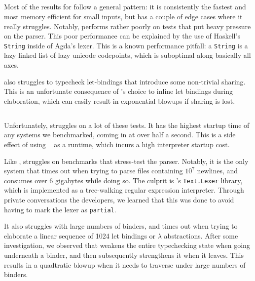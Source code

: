 \documentclass[a4paper,UKenglish,cleveref, autoref, thm-restate,anonymous]{lipics-v2021}
\begin{document}
\subsection{\agda}

Most of the results for \agda follow a general pattern: it is consistently the
fastest and most memory efficient for small inputs, but has a couple of edge
cases where it really struggles. Notably, \agda performs rather poorly on tests
that put heavy pressure on the parser. This poor performance can be explained
by the use of Haskell's \lstinline|String| inside of Agda's lexer. This is a
known performance pitfall: a \lstinline|String| is a lazy linked list of lazy
unicode codepoints, which is suboptimal along basically all axes.

\agda also struggles to typecheck let-bindings that introduce some non-trivial
sharing. This is an unfortunate consequence of \agda's choice to inline let
bindings during elaboration, which can easily result in exponential blowups
if sharing is lost.

\subsection{\idris}

Unfortunately, \idris struggles on a lot of these tests. It has the highest startup time
of any systems we benchmarked, coming in at over half a second. This is a side effect of using
\chez~\cite{Dybvig:2006} as a runtime, which incurs a high interpreter startup cost.

Like \agda, \idris struggles on benchmarks that stress-test the parser. Notably, it
is the only system that times out when trying to parse files containing \(10^{7}\) newlines,
and consumes over 6 gigabytes while doing so. The culprit is \idris's \texttt{Text.Lexer} library,
which is implemented as a tree-walking regular expression interpreter. Through private conversations
the developers, we learned that this was done to avoid having to mark the lexer as \texttt{partial}.

It also struggles with large numbers of binders, and times out when trying to elaborate a linear sequence of 1024
let bindings or \(\lambda\) abstractions. After some investigation, we observed that \idris weakens the entire typechecking state
when going underneath a binder, and then subsequently strengthens it when it leaves. This results in
a quadtratic blowup when it needs to traverse under large numbers of binders.
\end{document}

